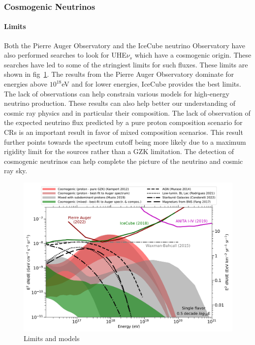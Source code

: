 \subsubsection*{Cosmogenic Neutrinos}

  \paragraph{Limits}
  \label{subsubsec:CosmoNuLimits}
  Both the Pierre Auger Observatory and the IceCube neutrino Observatory have also performed searches to look for UHE$\nu_s$ which have a cosmogenic origin. These searches have led to some of the stringiest limits for such fluxes. These limits are shown in fig~\ref{fig:Nu_limits_auger}. The results from the Pierre Auger Observatory dominate for energies above $10^{18}$eV and for lower energies, IceCube provides the best limits. The lack of observations can help constrain various models for high-energy neutrino production. These results can also help better our understanding of cosmic ray physics and in particular their composition. The lack of observation of the expected neutrino flux predicted by a pure proton composition scenario for CRs is an important result in favor of mixed composition scenarios. This result further points towards the spectrum cutoff being more likely due to a maximum rigidity limit for the sources rather than a GZK limitation. The detection of cosmogenic neutrinos can help complete the picture of the neutrino and cosmic ray sky. 

\begin{figure}[t!]
  \centering
  \includegraphics[width=14.5cm]{thesis_figures/CRnNu/neutrinolimits_icrc2023_wiki.pdf}
  \caption{Limits and models~\cite{PierreAuger:2023pjg}}
  \label{fig:Nu_limits_auger}
\end{figure}

